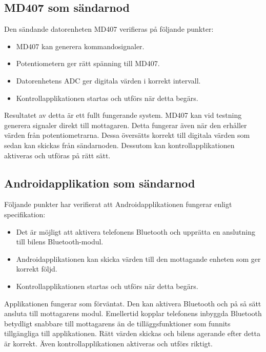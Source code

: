 \documentclass[a4paper]{article}
\begin{document}

\subsection{MD407 som sändarnod}
Den sändande datorenheten MD407 verifieras på följande punkter:
\begin{itemize}
\item MD407 kan generera kommandosignaler.
\item Potentiometern ger rätt spänning till MD407.
\item Datorenhetens ADC ger digitala värden i korrekt intervall.
\item Kontrollapplikationen startas och utförs när detta begärs.
\end{itemize}

\noindent
Resultatet av detta är ett fullt fungerande system. MD407 kan vid testning generera signaler direkt till mottagaren. Detta fungerar även när den erhåller värden från potentiometrarna. Dessa översätts korrekt till digitala värden som sedan kan skickas från sändarnoden. Dessutom kan kontrollapplikationen aktiveras och utföras på rätt sätt.


\subsection{Androidapplikation som sändarnod}
Följande punkter har verifierat att Androidapplikationen fungerar enligt specifikation:

\begin{itemize}
\item Det är möjligt att aktivera telefonens Bluetooth och upprätta en anslutning till bilens Bluetooth-modul.
\item Androidapplikationen kan skicka värden till den mottagande enheten som ger korrekt följd.
\item Kontrollapplikationen startas och utförs när detta begärs.
\end{itemize}

\noindent
Applikationen fungerar som förväntat. Den kan aktivera Bluetooth och på så sätt ansluta till mottagarens modul. Emellertid kopplar telefonens inbyggda Bluetooth betydligt snabbare till mottagarens än de tilläggsfunktioner som funnits tillgängliga till applikationen. Rätt värden skickas och bilens agerande efter detta är korrekt. Även kontrollapplikationen aktiveras och utförs riktigt.
\end{document}
